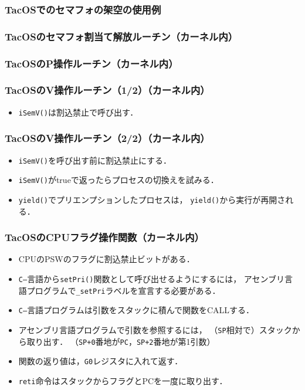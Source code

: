 \documentclass{beamer}                   %
\begin{document}
\begin{frame}
  \frametitle{TacOSでのセマフォの架空の使用例}
  
\end{frame}

\begin{frame}
  \frametitle{TacOSのセマフォ割当て解放ルーチン（カーネル内）}
  
\end{frame}

\begin{frame}
  \frametitle{TacOSのP操作ルーチン（カーネル内）}
  
\end{frame}

\begin{frame}
  \frametitle{TacOSのV操作ルーチン（1/2）（カーネル内）}
  
  \begin{itemize}
  \item {\tt iSemV()}は割込禁止で呼び出す．
  \end{itemize}
\end{frame}

\begin{frame}
  \frametitle{TacOSのV操作ルーチン（2/2）（カーネル内）}
  
  \begin{itemize}
  \item {\tt iSemV()}を呼び出す前に割込禁止にする．
  \item {\tt iSemV()}がtrueで返ったらプロセスの切換えを試みる．
  \item {\tt yield()}でプリエンプションしたプロセスは，
    {\tt yield()}から実行が再開される．
  \end{itemize}
\end{frame}

\begin{frame}
  \frametitle{TacOSのCPUフラグ操作関数（カーネル内）}
  
  \begin{itemize}
  \item CPUのPSWのフラグに割込禁止ビットがある．
  \item {\tt C--}言語から{\tt setPri()}関数として呼び出せるようにするには，
    アセンブリ言語プログラムで{\tt \_setPri}ラベルを宣言する必要がある．
  \item {\tt C--}言語プログラムは引数をスタックに積んで関数をCALLする．
  \item アセンブリ言語プログラムで引数を参照するには，
    （{\tt SP}相対で）スタックから取り出す．
    （{\tt SP+0}番地が{\tt PC}，{\tt SP+2}番地が第1引数）
  \item 関数の返り値は，{\tt G0}レジスタに入れて返す．
  \item {\tt reti}命令はスタックからフラグとPCを一度に取り出す．
  \end{itemize}
\end{frame}
\end{document}
